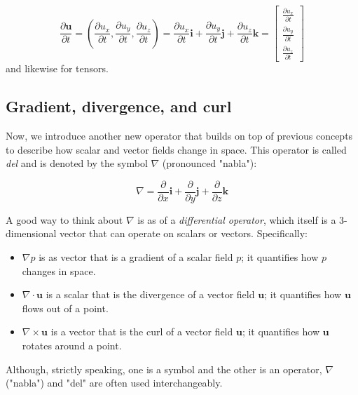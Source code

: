 \documentclass[12pt]{article}
\numberwithin{equation}{section}
\numberwithin{figure}{section}
\numberwithin{table}{section}
\begin{document}
\begin{equation}
  \frac{\partial \mathbf{u}}{\partial t}
    = (\frac{\partial u_x}{\partial t}, \frac{\partial u_y}{\partial t}, \frac{\partial u_z}{\partial t})
    = \frac{\partial u_x}{\partial t} \mathbf{i} + \frac{\partial u_y}{\partial t} \mathbf{j} + \frac{\partial u_z}{\partial t} \mathbf{k}
    = \begin{bmatrix}
        \frac{\partial u_x}{\partial t} \\
        \frac{\partial u_y}{\partial t} \\
        \frac{\partial u_z}{\partial t}
      \end{bmatrix}
\end{equation}
and likewise for tensors.\\

\subsection{Gradient, divergence, and curl}

Now, we introduce another new operator that builds on top of previous
concepts to describe how scalar and vector fields change in space.
This operator is called \textit{del} and is denoted by the symbol
$\nabla$ (pronounced "nabla"):

\begin{equation}
  \label{eq:nabla}
  \nabla = \frac{\partial}{\partial x} \mathbf{i} +
    \frac{\partial}{\partial y} \mathbf{j} +
    \frac{\partial}{\partial z} \mathbf{k}
\end{equation}

A good way to think about $\nabla$ is as of a \textit{differential operator},
which itself is a 3-dimensional vector that can operate on scalars or vectors.
Specifically:

\begin{itemize}
  \item $\nabla p$ is as vector that is a gradient of a scalar field $p$;
  it quantifies how $p$ changes in space.
  \item $\nabla \cdot \mathbf{u}$ is a scalar that is the divergence of a vector
  field $\mathbf{u}$; it quantifies how $\mathbf{u}$ flows out of a point.
  \item $\nabla \times \mathbf{u}$ is a vector that is the curl of a vector field
  $\mathbf{u}$; it quantifies how $\mathbf{u}$ rotates around a point.
\end{itemize}

Although, strictly speaking, one is a symbol and the other is an operator,
$\nabla$ ("nabla") and "del" are often used interchangeably.
\end{document}
